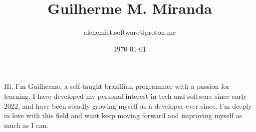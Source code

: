 \documentclass[12pt,a4paper]{article}
\title{Guilherme M. Miranda}
\author{alchemist.software@proton.me}
\date{\today}
\begin{document}
\maketitle

Hi, I'm Guilherme, a self-taught brazillian programmer with a passion for learning.
I have developed my personal interest in tech and software since early 2022,
and have been steadly growing myself as a developer ever since. I'm deeply in love
with this field and want keep moving forward and improving myself as much as I can.
\end{document}
